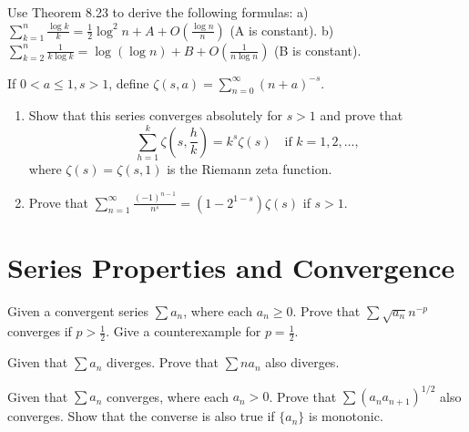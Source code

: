 \begin{problembox}
Use Theorem 8.23 to derive the following formulas:
a) \(\sum_{k=1}^{n} \frac{\log k}{k} = \frac{1}{2} \log^2 n + A + O \left( \frac{\log n}{n} \right)\) (A is constant).
b) \(\sum_{k=2}^{n} \frac{1}{k \log k} = \log (\log n) + B + O \left( \frac{1}{n \log n} \right)\) (B is constant).
\end{problembox}



\begin{problembox}
If \(0 < a \leq 1, s > 1\), define \(\zeta(s, a) = \sum_{n=0}^{\infty} (n + a)^{-s}\).
\begin{enumerate}[label=\alph*)]
\item Show that this series converges absolutely for \(s > 1\) and prove that
\[\sum_{h=1}^{k} \zeta \left( s, \frac{h}{k} \right) = k^s \zeta(s) \quad \text{if } k = 1, 2, \ldots,\]
where \(\zeta(s) = \zeta(s, 1)\) is the Riemann zeta function.
\item Prove that \(\sum_{n=1}^{\infty} \frac{(-1)^{n-1}}{n^s} = (1 - 2^{1-s}) \zeta(s)\) if \(s > 1\).
\end{enumerate}
\end{problembox}

\section{Series Properties and Convergence}



\begin{problembox}
Given a convergent series \(\sum a_n\), where each \(a_n \geq 0\). Prove that \(\sum \sqrt{a_n} n^{-p}\) converges if \(p > \frac{1}{2}\). Give a counterexample for \(p = \frac{1}{2}\).
\end{problembox}



\begin{problembox}
Given that \(\sum a_n\) diverges. Prove that \(\sum n a_n\) also diverges.
\end{problembox}



\begin{problembox}
Given that \(\sum a_n\) converges, where each \(a_n > 0\). Prove that \(\sum (a_n a_{n+1})^{1/2}\) also converges. Show that the converse is also true if \(\{a_n\}\) is monotonic.
\end{problembox}



